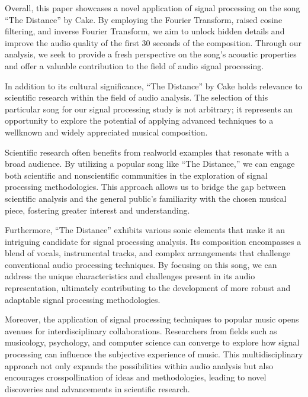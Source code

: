 \documentclass[letterpaper,10pt,english]{jupyterBook}
\begin{document}
\sphinxAtStartPar
Overall, this paper showcases a novel application of signal processing on the song “The Distance” by Cake. By employing the Fourier Transform, raised cosine filtering, and inverse Fourier Transform, we aim to unlock hidden details and improve the audio quality of the first 30 seconds of the composition. Through our analysis, we seek to provide a fresh perspective on the song’s acoustic properties and offer a valuable contribution to the field of audio signal processing.

\sphinxAtStartPar
In addition to its cultural significance, “The Distance” by Cake holds relevance to scientific research within the field of audio analysis. The selection of this particular song for our signal processing study is not arbitrary; it represents an opportunity to explore the potential of applying advanced techniques to a well\sphinxhyphen{}known and widely appreciated musical composition.

\sphinxAtStartPar
Scientific research often benefits from real\sphinxhyphen{}world examples that resonate with a broad audience. By utilizing a popular song like “The Distance,” we can engage both scientific and non\sphinxhyphen{}scientific communities in the exploration of signal processing methodologies. This approach allows us to bridge the gap between scientific analysis and the general public’s familiarity with the chosen musical piece, fostering greater interest and understanding.

\sphinxAtStartPar
Furthermore, “The Distance” exhibits various sonic elements that make it an intriguing candidate for signal processing analysis. Its composition encompasses a blend of vocals, instrumental tracks, and complex arrangements that challenge conventional audio processing techniques. By focusing on this song, we can address the unique characteristics and challenges present in its audio representation, ultimately contributing to the development of more robust and adaptable signal processing methodologies.

\sphinxAtStartPar
Moreover, the application of signal processing techniques to popular music opens avenues for interdisciplinary collaborations. Researchers from fields such as musicology, psychology, and computer science can converge to explore how signal processing can influence the subjective experience of music. This multidisciplinary approach not only expands the possibilities within audio analysis but also encourages cross\sphinxhyphen{}pollination of ideas and methodologies, leading to novel discoveries and advancements in scientific research.
\end{document}
